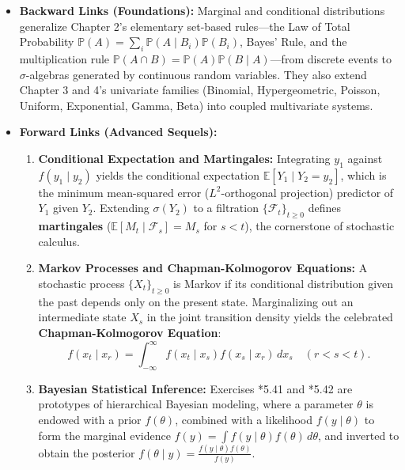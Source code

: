 \documentclass[11pt, letterpaper]{article}
\theoremstyle{definition}
\theoremstyle{remark}
\newcommand{\E}{\mathbb{E}}
\newcommand{\Prob}{\mathbb{P}}
\newcommand{\F}{\mathcal{F}}
\begin{document}
\begin{itemize}
    \item \textbf{Backward Links (Foundations):}
    Marginal and conditional distributions generalize Chapter 2's elementary set-based rules—the Law of Total Probability $\Prob(A) = \sum_i \Prob(A \mid B_i)\Prob(B_i)$, Bayes' Rule, and the multiplication rule $\Prob(A \cap B) = \Prob(A)\Prob(B \mid A)$—from discrete events to $\sigma$-algebras generated by continuous random variables. They also extend Chapter 3 and 4's univariate families (Binomial, Hypergeometric, Poisson, Uniform, Exponential, Gamma, Beta) into coupled multivariate systems.
    \item \textbf{Forward Links (Advanced Sequels):}
    \begin{enumerate}
        \item \textbf{Conditional Expectation and Martingales:} Integrating $y_1$ against $f(y_1 \mid y_2)$ yields the conditional expectation $\E[Y_1 \mid Y_2 = y_2]$, which is the minimum mean-squared error ($L^2$-orthogonal projection) predictor of $Y_1$ given $Y_2$. Extending $\sigma(Y_2)$ to a filtration $\{\F_t\}_{t \ge 0}$ defines \textbf{martingales} ($\E[M_t \mid \F_s] = M_s$ for $s < t$), the cornerstone of stochastic calculus.
        \item \textbf{Markov Processes and Chapman-Kolmogorov Equations:} A stochastic process $\{X_t\}_{t \ge 0}$ is Markov if its conditional distribution given the past depends only on the present state. Marginalizing out an intermediate state $X_s$ in the joint transition density yields the celebrated \textbf{Chapman-Kolmogorov Equation}:
        \[ f(x_t \mid x_r) = \int_{-\infty}^\infty f(x_t \mid x_s) f(x_s \mid x_r) \, dx_s \quad (r < s < t). \]
        \item \textbf{Bayesian Statistical Inference:} Exercises *5.41 and *5.42 are prototypes of hierarchical Bayesian modeling, where a parameter $\theta$ is endowed with a prior $f(\theta)$, combined with a likelihood $f(y \mid \theta)$ to form the marginal evidence $f(y) = \int f(y \mid \theta)f(\theta) \, d\theta$, and inverted to obtain the posterior $f(\theta \mid y) = \frac{f(y \mid \theta)f(\theta)}{f(y)}$.
    \end{enumerate}
\end{itemize}

\newpage
\end{document}
